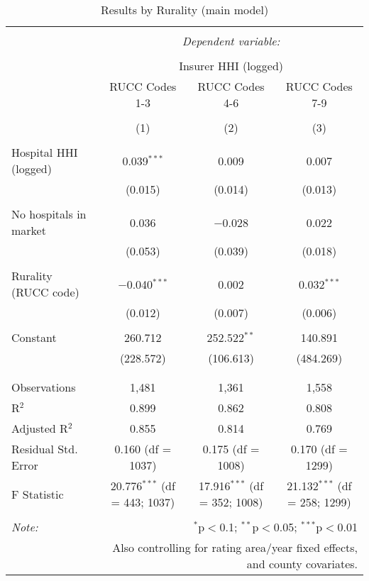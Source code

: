 
\begin{table}[!htbp] \centering 
  \caption{Results by Rurality (main model)} 
  \label{} 
\scriptsize 
\begin{tabular}{@{\extracolsep{5pt}}lccc} 
\\[-1.8ex]\hline 
\hline \\[-1.8ex] 
 & \multicolumn{3}{c}{\textit{Dependent variable:}} \\ 
\cline{2-4} 
\\[-1.8ex] & \multicolumn{3}{c}{Insurer HHI (logged)} \\ 
 & RUCC Codes 1-3 & RUCC Codes 4-6 & RUCC Codes 7-9 \\ 
\\[-1.8ex] & (1) & (2) & (3)\\ 
\hline \\[-1.8ex] 
 Hospital HHI (logged) & 0.039$^{***}$ & 0.009 & 0.007 \\ 
  & (0.015) & (0.014) & (0.013) \\ 
  & & & \\ 
 No hospitals in market & 0.036 & $-$0.028 & 0.022 \\ 
  & (0.053) & (0.039) & (0.018) \\ 
  & & & \\ 
 Rurality (RUCC code) & $-$0.040$^{***}$ & 0.002 & 0.032$^{***}$ \\ 
  & (0.012) & (0.007) & (0.006) \\ 
  & & & \\ 
 Constant & 260.712 & 252.522$^{**}$ & 140.891 \\ 
  & (228.572) & (106.613) & (484.269) \\ 
  & & & \\ 
\hline \\[-1.8ex] 
Observations & 1,481 & 1,361 & 1,558 \\ 
R$^{2}$ & 0.899 & 0.862 & 0.808 \\ 
Adjusted R$^{2}$ & 0.855 & 0.814 & 0.769 \\ 
Residual Std. Error & 0.160 (df = 1037) & 0.175 (df = 1008) & 0.170 (df = 1299) \\ 
F Statistic & 20.776$^{***}$ (df = 443; 1037) & 17.916$^{***}$ (df = 352; 1008) & 21.132$^{***}$ (df = 258; 1299) \\ 
\hline 
\hline \\[-1.8ex] 
\textit{Note:}  & \multicolumn{3}{r}{$^{*}$p$<$0.1; $^{**}$p$<$0.05; $^{***}$p$<$0.01} \\ 
 & \multicolumn{3}{r}{Also controlling for rating area/year fixed effects, and county covariates.} \\ 
\end{tabular} 
\end{table} 
